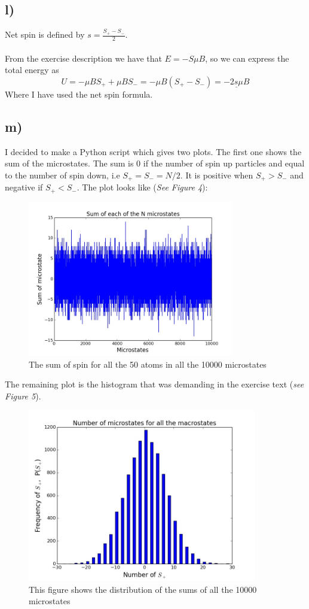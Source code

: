 \documentclass{scrartcl}
\begin{document}
\subsection*{l)}
Net spin is defined by $s=\frac{S_+-S_-}{2}$.\\\\ From the exercise description we have that $E=-S\mu B$, so we can express the total energy as
$$U=-\mu B S_++\mu B S_-=-\mu B(S_+-S_-)=\underline{-2s\mu B}$$
Where I have used the net spin formula. 

\subsection*{m)}
I decided to make a Python script which gives two plots. The first one shows the sum of the microstates. The sum is 0 if the number of spin up particles and equal to the number of spin down, i.e $S_+=S_-=N/2$. It is positive when $S_+ > S_-$ and negative if $S_+ < S_-$. The plot looks like (\textit{See Figure 4}):
\begin{figure}[!htbp]
\centering
\includegraphics[width=90mm]{oblig1m1.jpg}
\caption{The sum of spin for all the 50 atoms in all the 10000 microstates \label{overflow}}
\end{figure}
\par\vspace{3mm}The remaining plot is the histogram that was demanding in the exercise text (\textit{see Figure 5}).
\begin{figure}[!htbp]
\centering
\includegraphics[width=100mm]{oblig1m2.jpg}
\caption{This figure shows the distribution of the sums of all the 10000 microstates\label{overflow}}
\end{figure}
\end{document}
